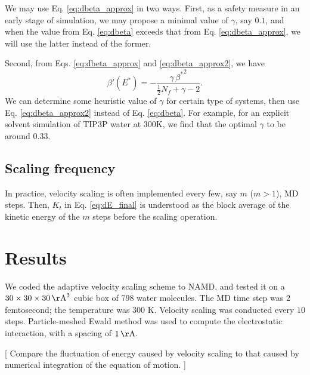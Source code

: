\documentclass[reprint]{revtex4-1}
\begin{document}
We may use Eq. \eqref{eq:dbeta_approx} in two ways.
%
First, as a safety measure in an early stage of simulation,
we may propose a minimal value of $\gamma$, say $0.1$,
and when the value from Eq. \eqref{eq:dbeta}
exceeds that from Eq. \eqref{eq:dbeta_approx},
we will use the latter instead of the former.

Second, from
Eqs. \eqref{eq:dbeta_approx} and \eqref{eq:dbeta_approx2},
we have
%
\begin{equation}
  \beta'(E^*)
  =
  -\frac{ \gamma \, {\beta^*}^2 }
  { \frac{1}{2} N_f + \gamma - 2 }
  .
  \label{eq:dbeta_approx2}
\end{equation}
%
We can determine some heuristic value of $\gamma$
for certain type of systems,
then use Eq. \eqref{eq:dbeta_approx2}
instead of Eq. \eqref{eq:dbeta}.
%
For example,
for an explicit solvent simulation of TIP3P water\cite{jorgensen1983}
at 300K, we find that the optimal $\gamma$
to be around $0.33$.



\subsection{Scaling frequency}


In practice, velocity scaling is often implemented every few,
say $m$ ($m > 1$), MD steps.
%
Then,
$K_t$ in Eq. \eqref{eq:dE_final} is understood
as the block average of the kinetic energy of the $m$ steps
before the scaling operation.



\section{Results}



We coded the adaptive velocity scaling scheme to NAMD\cite{NAMD},
and tested it on a $30 \times 30\times 30 \, \mathrm{\AA}^3$ cubic box
of $798$ water molecules.
%
The MD time step was $2$ femtosecond;
the temperature was $300$ K.
%
Velocity scaling was conducted every $10$ steps.
%
Particle-meshed Ewald method\cite{essmann1995} was used to
compute the electrostatic interaction,
with a spacing of $1 \, \mathrm{\AA}$.

[
Compare the fluctuation of energy caused by velocity scaling to
that caused by numerical integration of the equation of motion.
]
\end{document}
